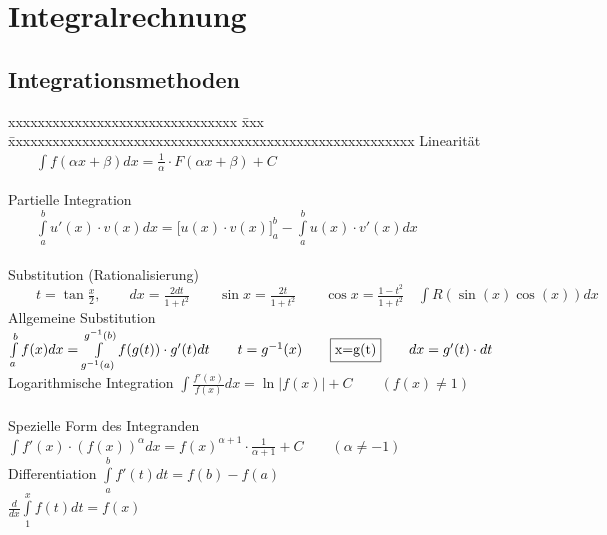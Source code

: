 \section{Integralrechnung }
\subsection{Integrationsmethoden }

  \begin{tabbing}
       xxxxxxxxxxxxxxxxxxxxxxxxxxxxxxx \= xxx \= xxxxxxxxxxxxxxxxxxxxxxxxxxxxxxxxxxxxxxxxxxxxxxxxxxxxxxx\kill  
       Linearität\>      
     $\qquad\int{f(\alpha x+\beta )dx=\frac{1}{\alpha}\cdot F(\alpha x+
    \beta)+C}$\\ \\
       Partielle Integration\>
     $\qquad\int\limits_a^b{u'(x)\cdot v(x)dx}=\biggl[ u(x)\cdot v(x) \biggr]_a^b
     -\int\limits_a^b{u(x)\cdot v'(x)dx}$\\ \\ Substitution (Rationalisierung)\>
     $\qquad t=\tan\frac{x}{2}, \qquad dx=\frac{2dt}{1+t^2} \qquad 
     \sin  x=\frac{2t}{1+t^2} \qquad \cos x=\frac{1-t^2}{1+t^2}
    \quad\int{R(\sin(x)\cos(x))dx}$\\ 
     Allgemeine Substitution \> \>
    $\int\limits_{a}^{b}{f(x)dx}=\int\limits_{g^{-1}(a)}^{g^{-1}(b)}{f(g(t))\cdot
    g'(t)dt}\qquad t=g^{-1}(x)\qquad  \fbox{x=g(t)}\qquad dx=g'(t)\cdot dt$\\
     Logarithmische Integration \>\>
      $ \int{\frac{f'(x)}{f(x)}dx}=\ln|f(x)|+C  \qquad{(f(x)\neq 1)}$\\ \\
     Spezielle Form des Integranden \>\>
    $\int{f'(x)\cdot (f(x))^{\alpha} dx}= f(x)^{\alpha +1}\cdot
    \frac{1}{\alpha+1}+C \qquad{(\alpha \neq -1)}$\\ 
     Differentiation\>\>
    $\int \limits ^{b} _{a} {f'(t)dt}=f(b)-f(a)$\\ \>\>
    $\frac{d}{dx} \int \limits ^{x} _{1} {f(t)dt}=f(x)$
    \end{tabbing}

